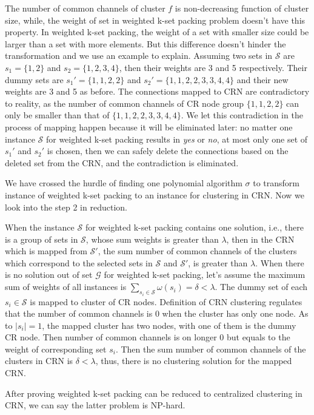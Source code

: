 \documentclass[journal,comsoc]{IEEEtran}
\makeatletter
\theoremstyle{mytheoremstyle}
\theoremstyle{mytheoremstyle}
\theoremstyle{mytheoremstyle}
\renewenvironment{proof}[1][\proofname]{%
      \par\pushQED{\qed}\fontfamily{ptm}\selectfont%
      \topsep6\p@\@plus6\p@\relax
      \trivlist\item[\hskip\labelsep\bfseries#1\@addpunct{.}]%
      \ignorespaces
    }{%
      \popQED\endtrivlist\@endpefalse
    }
\newcommand{\ie}{i.e., }
\makeatother
\begin{document}
\begin{proof}
\begin{itemize}
The number of common channels of cluster $f$ is non-decreasing function of cluster size, while, the weight of set in weighted k-set packing problem doesn't have this property.
In weighted k-set packing, the weight of a set with smaller size could be larger than a set with more elements.
But this difference doesn't hinder the transformation and we use an example to explain.
Assuming two sets in $\mathcal{S}$ are $s_1=\{1,2\}$ and $s_2=\{1,2,3,4\}$, then their weights are 3 and 5 respectively.
Their dummy sets are $s_1'=\{1,1,2,2\}$ and $s_2'=\{1,1,2,2,3,3,4,4\}$ and their new weights are 3 and 5 as before.
The connections mapped to CRN are contradictory to reality, as the number of common channels of CR node group $\{1,1,2,2\}$ can only be smaller than that of $\{1,1,2,2,3,3,4,4\}$.
We let this contradiction in the process of mapping happen because it will be eliminated later: no matter one instance $\mathcal{S}$ for weighted k-set packing results in \textit{yes} or \textit{no}, at most only one set of $s_1'$ and $s_2'$ is chosen, then we can safely delete the connections based on the deleted set from the CRN, and the contradiction is eliminated.
\end{itemize}






We have crossed the hurdle of finding one polynomial algorithm $\sigma$ to transform instance of weighted k-set packing to an instance for clustering in CRN.
Now we look into the step 2 in reduction.

When the instance $\mathcal{S}$ for weighted k-set packing contains one solution, \ie there is a group of sets in $\mathcal{S}$, whose sum weights is greater than $\lambda$, then in the CRN which is mapped from $\mathcal{S}'$, the sum number of common channels of the clusters which correspond to the selected sets in $\mathcal{S}$ and $\mathcal{S}'$, is greater than $\lambda$.
%
When there is no solution out of set $\mathcal{G}$ for weighted k-set packing, let's assume the maximum sum of weights of all instances is $\sum_{s_i\in \mathcal{S}}\omega(s_i)=\delta < \lambda$. 
The dummy set of each $s_i\in \mathcal{S}$ is mapped to cluster of CR nodes.
Definition of CRN clustering regulates that the number of common channels is 0 when the cluster has only one node.
As to $|s_i|=1$, the mapped cluster has two nodes, with one of them is the dummy CR node.
Then number of common channels is on longer 0 but equals to the weight of corresponding set $s_i$.
Then the sum number of common channels of the clusters in CRN is $\delta < \lambda$, thus, there is no clustering solution for the mapped CRN.

After proving weighted k-set packing can be reduced to centralized clustering in CRN, we can say the latter problem is NP-hard.
\end{proof}
\end{document}

